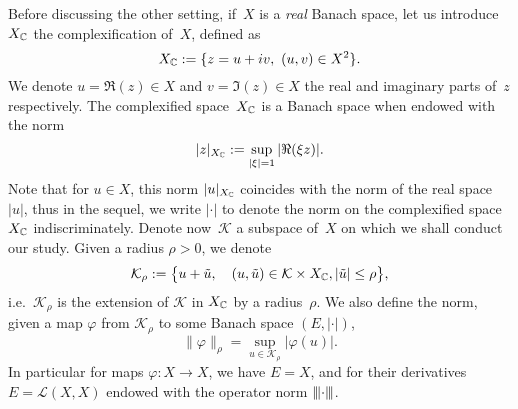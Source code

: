 Before discussing the other setting, if~$X$ is a \textit{real} Banach
space, let us introduce~$X_{\mathbb{C}}$ the complexification of~$X$, defined
as 
\begin{equation*}
  X_{\setC} := \{ z = u + iv,\ (u,v) \in X^2 \} .
\end{equation*}
We denote $u = \Re(z) \in X$ and $v = \Im(z) \in X$ the real and
imaginary parts of~$z$ respectively. The complexified space~$X_{\mathbb{C}}$ is a
Banach space when endowed with the norm 
\begin{equation*}
  |z|_{X_{\mathbb{C}}} := \sup_{|\xi| = 1} |\Re(\xi z)|. 
\end{equation*}
Note that for $u \in X$, this norm $|u|_{X_{\mathbb{C}}}$ coincides with the norm
of the real space $|u|$, thus in the sequel, we write $|\cdot|$ to
denote the norm on the complexified space $X_{\mathbb{C}}$ indiscriminately.
Denote now~$\mathcal{K}$ a subspace of~$X$ on which we shall conduct our
study. Given a radius $\rho > 0$, we denote 
\begin{equation*}
  \mathcal{K}_{\rho} := \big\{
    u + \tilde{u}, \quad 
      (u,\tilde{u}) \in \mathcal{K} \times X_{\mathbb{C}}, 
      |\tilde{u}| \leq \rho
  \big\} ,
\end{equation*}
i.e.~$\mathcal{K}_\rho$ is the extension of $\mathcal{K}$ in $X_{\mathbb{C}}$ by a
radius~$\rho$. We also define the norm, given a map $\varphi$ from
$\mathcal{K}_\rho$ to some Banach space $(E, |\cdot|)$, 
\begin{equation*}
  \| \varphi \|_\rho = \sup_{u \in \mathcal{K}_\rho} |\varphi(u) |.
\end{equation*}
In particular for maps $\varphi: X \rightarrow X$, we have $E = X$, and
for their derivatives $E = \mathcal{L}(X,X)$ endowed with the operator
norm ${\left\vert\kern-0.25ex\left\vert\kern-0.25ex\left\vert \cdot \right\vert\kern-0.25ex\right\vert\kern-0.25ex\right\vert}$. 

